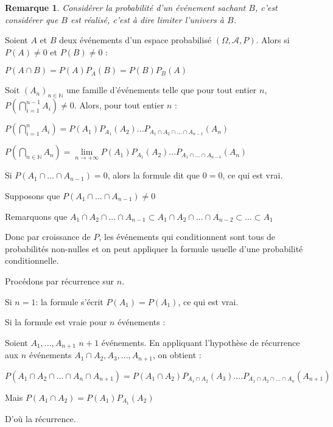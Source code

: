 \documentclass[a4paper,12pt]{book}
\newcommand{\Thr}[2]{\begin{tcolorbox}[sharp corners, colback=white,colframe=red!90!black!75, title=Théorème : #1]#2\end{tcolorbox}}
\newcommand{\Prop}[2]{\begin{tcolorbox}[sharp corners, colback=white,colframe=red!90!black!75, title=Proposition : #1]#2\end{tcolorbox}}
\newcommand{\Pre}[1]{\begin{tcolorbox}[sharp corners, colback=white,colframe=green!60!green!30!black!75, title=Preuve]#1\end{tcolorbox}}
\newtheorem{Rem}{Remarque}[section]
\def\N{\mathbb{N}}
\begin{document}
\begin{Rem}
Considérer la probabilité d'un événement sachant $B$, c'est considérer que $B$ est réalisé, c'est à dire limiter l'univers à $B$.
\end{Rem}
\Prop{}{Soient $A$ et $B$ deux événements d'un espace probabilisé $(\Omega, \mathcal{A}, P)$. Alors si $P(A)\neq 0$ et $P(B)\neq 0$ :
\par \begin{center} $P(A\cap B)=P(A)P_A(B)=P(B)P_B(A)$\end{center}}
\Thr{Formule des probabilités composées}{Soit $(A_n)_{n\in\N}$ une famille d'événements telle que pour tout entier $n$, $P\left(\bigcap_{i=1}^{n-1}A_i\right)\neq 0$. Alors, pour tout entier $n$ :
\par\begin{center} $P\left(\bigcap_{i=1}^nA_i\right)=P(A_1)P_{A_1}(A_2)...P_{A_1\cap A_2\cap...\cap A_{n-1}}(A_n)$\end{center}
\par\begin{center} $P\left(\bigcap_{n\in\N}A_n\right) = \lim\limits_{n\to+\infty}P(A_1)P_{A_1}(A_2)...P_{A_1\cap...\cap A_{n-1}}(A_n)$\end{center}}
\Pre{Si $P(A_1\cap...\cap A_{n-1})=0$, alors la formule dit que $0=0$, ce qui est vrai.
\par Supposons que $P(A_1\cap...\cap A_{n-1})\neq 0$
\par Remarquons que $A_1\cap A_2\cap...\cap A_{n-1}\subset A_1\cap A_2\cap...\cap A_{n-2}\subset...\subset A_1$
\par Donc par croissance de $P$, les événements qui conditionnent sont tous de probabilités non-nulles et on peut appliquer la formule usuelle d'une probabilité conditionnelle.
\par Procédons par récurrence sur $n$.
\par Si $n=1$: la formule s'écrit $P(A_1)=P(A_1)$, ce qui est vrai.
\par Si la formule est vraie pour $n$ événements : \par Soient $A_1,...,A_{n+1}$ $n+1$ événements. En appliquant l'hypothèse de récurrence aux $n$ événements $A_1\cap A_2, A_3,...,A_{n+1}$, on obtient :
\par $P(A_1\cap A_2\cap...\cap A_n\cap A_{n+1}) = P(A_1\cap A_2)P_{A_1\cap A_2}(A_3)....P_{A_1\cap A_2\cap...\cap A_n}(A_{n+1})$
\par Mais $P(A_1\cap A_2)=P(A_1)P_{A_1}(A_2)$
\par D'où la récurrence.}
\end{document}
